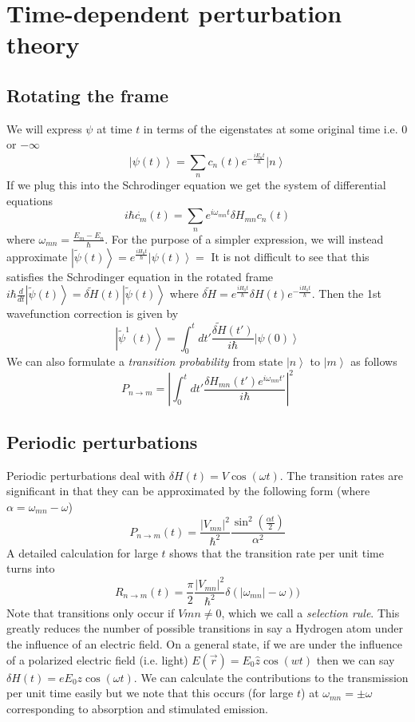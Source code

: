 \documentclass{article}
\newcommand{\ket}[1]{\left|#1\right\rangle}
\begin{document}
\section{Time-dependent perturbation theory}
\subsection{Rotating the frame}
We will express $\psi$ at time $t$ in terms of the eigenstates at some original time i.e. $0$ or $-\infty$
$$\ket{\psi(t)} = \sum_{n} c_n(t) e^{-\frac{iE_n t}{h}} \ket{n}$$
If we plug this into the Schrodinger equation we get the system of differential equations
\begin{equation}
\boxed{
i\hbar \dot{c_m} (t) =\sum_n e^{i\omega_{mn} t} \delta H_{mn} c_n(t)}
\end{equation}
where $\omega_{mn} = \frac{E_m-E_n}{\hbar}$. For the purpose of a simpler expression, we will instead approximate $\ket{\widetilde{\psi}(t)} = e^{\frac{iH_0 t}{\hbar}} \ket{\psi(t)} =$
It is not difficult to see that this satisfies the Schrodinger equation in the rotated frame $i\hbar \frac{d}{dt}\ket{\widetilde{\psi}(t)} = \widetilde{\delta H}(t) \ket{\widetilde{\psi}(t)}$ where $ \widetilde{\delta H} = e^{\frac{i H_0t}{\hbar}} \delta H(t)  e^{-\frac{i H_0t}{\hbar}}$. Then the 1st wavefunction correction is given by 
\begin{equation}
\boxed{
\ket{\widetilde{\psi}^1 (t)} = \int_0^t dt' \frac{\widetilde{\delta H}(t')}{i\hbar}\ket{\psi(0)}
}
\end{equation}
We can also formulate a \emph{transition probability} from state $\ket{n}$ to $\ket{m}$ as follows
\begin{equation}
P_{n\rightarrow m} = \left|\int_0^t dt'\frac{\delta H_{mn} (t') e^{i\omega_{mn} t'}}{i\hbar}\right|^2
\end{equation}
\subsection{Periodic perturbations}
Periodic perturbations deal with $\delta H(t) = V\cos(\omega t)$. The transition rates are significant in that they can be approximated by the following form (where $\alpha = \omega_{mn} - \omega$)
\begin{equation}
\boxed{
P_{n\rightarrow m} (t) = \frac{|V_{mn}|^2}{\hbar^2}\frac{\sin^2 (\frac{\alpha t}{2})}{\alpha^2}
}
\end{equation}
A detailed calculation for large $t$ shows that the transition rate per unit time turns into
$$R_{n\rightarrow m} (t) =\frac{\pi}{2} \frac{|V_{mn}|^2}{\hbar^2}\delta(|\omega_{mn}|-\omega))$$
Note that transitions only occur if $V{mn} \neq 0$, which we call a \emph{selection rule}. This greatly reduces the number of possible transitions in say a Hydrogen atom under the influence of an electric field. On a general state, if we are under the influence of a polarized electric field (i.e. light) $E(\vec{r}) =E_0\hat{z}\cos(wt)$ then we can say $\delta H (t) =eE_0 z\cos(\omega t)$. We can calculate the contributions to the transmission per unit time easily but we note that this occurs (for large $t$) at $\omega_{mn} =\pm \omega$ corresponding to absorption and stimulated emission. 
\end{document}
